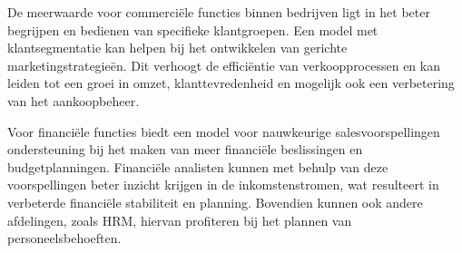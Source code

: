 De meerwaarde voor commerciële functies binnen bedrijven ligt in het beter begrijpen en bedienen van specifieke klantgroepen. Een model met klantsegmentatie kan helpen bij het ontwikkelen van gerichte marketingstrategieën. Dit verhoogt de efficiëntie van verkoopprocessen en kan leiden tot een groei in omzet, klanttevredenheid en mogelijk ook een verbetering van het aankoopbeheer.

Voor financiële functies biedt een model voor nauwkeurige salesvoorspellingen ondersteuning bij het maken van meer financiële beslissingen en budgetplanningen. Financiële analisten kunnen met behulp van deze voorspellingen beter inzicht krijgen in de inkomstenstromen, wat resulteert in verbeterde financiële stabiliteit en planning. Bovendien kunnen ook andere afdelingen, zoals HRM, hiervan profiteren bij het plannen van personeelsbehoeften.

